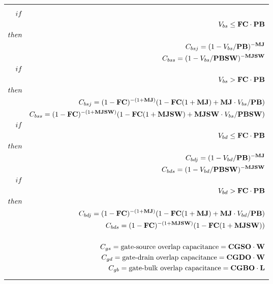 \begin{longtable}[H]{>{\setlength{\hsize}{\textwidth}}W}
\begin{eqnarray*}
if & & \\
& & V_{bs} \leq \bf FC\cdot PB\\
then && \\
&& C_{bsj} = (1 - V_{bs}/\bf PB)^{-MJ}\\
&& C_{bss} = (1 - V_{bs}/\bf PBSW)^{-MJSW}\\
if && \\
&& V_{bs} > \bf FC\cdot PB \\
then && \\
&& C_{bsj} = (1 - \mathbf{FC})^{-(1+\mathbf{MJ})}(1 - \mathbf{FC}
(1 + \mathbf{MJ}) + \mathbf{MJ}\cdot V_{bs}/\mathbf{PB})\\
&& C_{bss} = (1 - \mathbf{FC})^{-(1+\mathbf{MJSW})}(1 - \mathbf{FC}
(1 + \mathbf{MJSW}) + \mathbf{MJSW}\cdot V_{bs}/\mathbf{PBSW})\\
if && \\
&& V_{bd} \leq \bf FC\cdot PB \\
then && \\
&& C_{bdj} = (1 - V_{bd}/\bf PB)^{-MJ} \\
&& C_{bds} = (1 - V_{bd}/\bf PBSW)^{-MJSW} \\
if && \\
&& V_{bd} > \bf FC\cdot PB \\
then &&\\
&& C_{bdj} = (1 - \mathbf{FC})^{-(1+\mathbf{MJ})}(1 - \mathbf{FC}
(1 + \mathbf{MJ}) + \mathbf{MJ}\cdot V_{bd}/\mathbf{PB})\\
&& C_{bds} = (1 - \mathbf{FC})^{-(1+\mathbf{MJSW})}(1 - \mathbf{FC}
(1 + \mathbf{MJSW}))\\
\\
&& C_{gs} = \mbox{\rm gate-source overlap capacitance} = \bf
CGSO\cdot W \\
&& C_{gd} = \mbox{\rm gate-drain overlap capacitance} = \bf
CGDO\cdot W \\
&& C_{gb} = \mbox{\rm gate-bulk overlap capacitance} = \bf
CGBO\cdot L
\end{eqnarray*}

\end{longtable}

\addtocounter{table}{-1}


